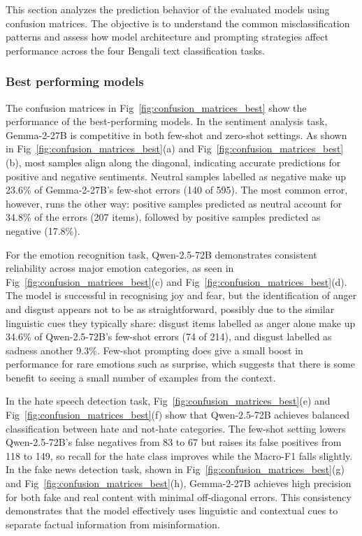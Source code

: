 \documentclass[10pt,letterpaper]{article}
\begin{document}
This section analyzes the prediction behavior of the evaluated models using confusion matrices. The objective is to understand the common misclassification patterns and assess how model architecture and prompting strategies affect performance across the four Bengali text classification tasks.

\subsubsection*{Best performing models}
\label{sec:best_performing_models}

The confusion matrices in Fig~\ref{fig:confusion_matrices_best} show the performance of the best-performing models. In the sentiment analysis task, Gemma-2-27B is competitive in both few-shot and zero-shot settings. As shown in Fig~\ref{fig:confusion_matrices_best}(a) and Fig~\ref{fig:confusion_matrices_best}(b), most samples align along the diagonal, indicating accurate predictions for positive and negative sentiments. Neutral samples labelled as negative make up 23.6\% of Gemma-2-27B's few-shot errors (140 of 595). The most common error, however, runs the other way: positive samples predicted as neutral account for 34.8\% of the errors (207 items), followed by positive samples predicted as negative (17.8\%).

For the emotion recognition task, Qwen-2.5-72B demonstrates consistent reliability across major emotion categories, as seen in Fig~\ref{fig:confusion_matrices_best}(c) and Fig~\ref{fig:confusion_matrices_best}(d). The model is successful in recognising joy and fear, but the identification of anger and disgust appears not to be as straightforward, possibly due to the similar linguistic cues they typically share: disgust items labelled as anger alone make up 34.6\% of Qwen-2.5-72B's few-shot errors (74 of 214), and disgust labelled as sadness another 9.3\%. Few-shot prompting does give a small boost in performance for rare emotions such as surprise, which suggests that there is some benefit to seeing a small number of examples from the context.

In the hate speech detection task, Fig~\ref{fig:confusion_matrices_best}(e) and Fig~\ref{fig:confusion_matrices_best}(f) show that Qwen-2.5-72B achieves balanced classification between hate and not-hate categories. The few-shot setting lowers Qwen-2.5-72B's false negatives from 83 to 67 but raises its false positives from 118 to 149, so recall for the hate class improves while the Macro-F1 falls slightly. In the fake news detection task, shown in Fig~\ref{fig:confusion_matrices_best}(g) and Fig~\ref{fig:confusion_matrices_best}(h), Gemma-2-27B achieves high precision for both fake and real content with minimal off-diagonal errors. This consistency demonstrates that the model effectively uses linguistic and contextual cues to separate factual information from misinformation.
\end{document}
